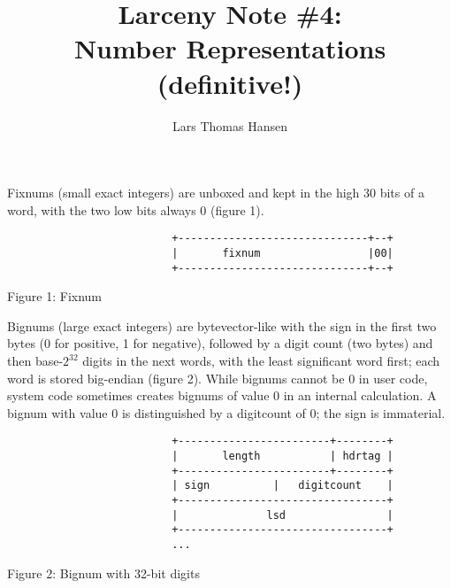 


\title{Larceny Note \#4: \\
       Number Representations \\
       {\tenrm (definitive!)}}
\author{Lars Thomas Hansen}


\maketitle

Fixnums (small exact integers) are unboxed and kept in the high 30
bits of a word, with the two low bits always 0 (figure 1).

\begin{minipage}{\linewidth}
\begin{verbatim}
                          +------------------------------+--+
                          |       fixnum                 |00|
                          +------------------------------+--+
\end{verbatim}
\centerline{Figure 1: Fixnum}
\end{minipage}

Bignums (large exact integers) are bytevector-like with the sign in
the first two bytes (0 for positive, 1 for negative), followed by a
digit count (two bytes) and then base-$2^{32}$ digits in the next
words, with the least significant word first; each word is stored
big-endian (figure 2).  While bignums cannot be 0 in user code, system
code sometimes creates bignums of value 0 in an internal calculation.
A bignum with value 0 is distinguished by a digitcount of 0; the sign
is immaterial.

\begin{minipage}{\linewidth}
\begin{verbatim}
                          +------------------------+--------+
                          |       length           | hdrtag |
                          +------------------------+--------+
                          | sign          |   digitcount    |
                          +---------------------------------+
                          |              lsd                |
                          +---------------------------------+
                          ...
\end{verbatim}
\centerline{Figure 2: Bignum with 32-bit digits}
\end{minipage}

